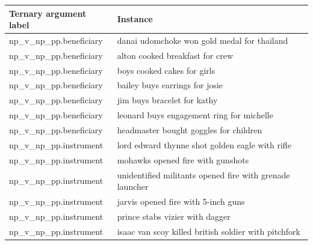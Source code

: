   \begin{table}[h]
 \centering
     \begin{tabular}{ll}
        \hline
        Ternary argument label &  Instance \\
       \hline
 np\_v\_np\_pp.beneficiary &	danai udomchoke	won	gold medal	for	thailand	\\
np\_v\_np\_pp.beneficiary &	alton	cooked	breakfast	for	crew	 \\
np\_v\_np\_pp.beneficiary & 	boys	cooked	cakes	for	girls	 \\
np\_v\_np\_pp.beneficiary &	bailey	buys	earrings	for	josie	 \\
np\_v\_np\_pp.beneficiary &	jim	buys	bracelet	for	kathy	 \\
np\_v\_np\_pp.beneficiary &	leonard	buys	engagement ring	for	michelle	 \\
np\_v\_np\_pp.beneficiary &	headmaster	bought	goggles	for	children	 \\
np\_v\_np\_pp.instrument &	lord edward thynne	shot	golden eagle	with	rifle	 \\
np\_v\_np\_pp.instrument &	mohawks	opened	fire	with	gunshots	 \\
np\_v\_np\_pp.instrument &	unidentified militants	opened	fire	with	grenade launcher	 \\
np\_v\_np\_pp.instrument &	jarvis	opened	fire	with	5-inch guns	 \\
np\_v\_np\_pp.instrument &	prince	stabs	vizier	with	dagger	 \\
np\_v\_np\_pp.instrument &	isaac van scoy	killed	british soldier	with	pitchfork	 \\

\end{tabular}
\end{table}
